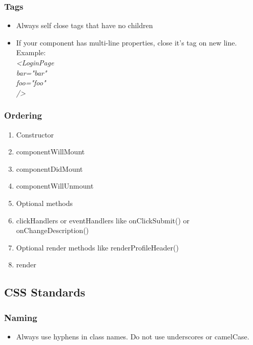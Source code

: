 \documentclass[12pt]{report}
\begin{document}
\subsubsection{Tags}
\begin{itemize}[noitemsep]
\item Always self close tags that have no children
\item If your component has multi-line properties, close it's tag on  new line. Example: \\
	\textit{
    	<LoginPage\\
        \hspace*{4ex}bar="bar"\\
        \hspace*{4ex}foo="foo"\\
        />
    }
\end{itemize}

\subsubsection{Ordering}
\begin{enumerate}[noitemsep]
\item Constructor
\item componentWillMount
\item componentDidMount
\item componentWillUnmount
\item Optional methods
\item clickHandlers or eventHandlers like onClickSubmit() or onChangeDescription()
\item Optional render methods like renderProfileHeader()
\item render
\end{enumerate}

\pagebreak
\subsection{CSS Standards}
\subsubsection{Naming}
\begin{itemize}[noitemsep]
\item Always use hyphens in class names. Do not use underscores or camelCase.
\end{itemize}
\end{document}
